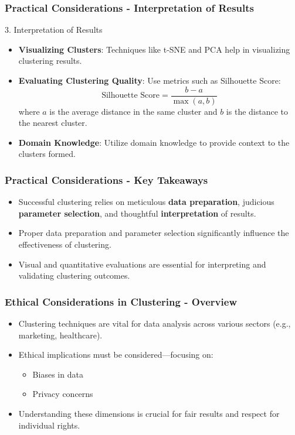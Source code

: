 \documentclass[aspectratio=169]{beamer}
\begin{document}
\begin{frame}[fragile]
    \frametitle{Practical Considerations - Interpretation of Results}
    \begin{block}{3. Interpretation of Results}
        \begin{itemize}
            \item \textbf{Visualizing Clusters}: Techniques like t-SNE and PCA help in visualizing clustering results.
            \item \textbf{Evaluating Clustering Quality}: Use metrics such as Silhouette Score:
            \begin{equation}
            \text{Silhouette Score} = \frac{b - a}{\max(a, b)}
            \end{equation}
            where \( a \) is the average distance in the same cluster and \( b \) is the distance to the nearest cluster.
            \item \textbf{Domain Knowledge}: Utilize domain knowledge to provide context to the clusters formed.
        \end{itemize}
    \end{block}
\end{frame}

\begin{frame}[fragile]
    \frametitle{Practical Considerations - Key Takeaways}
    \begin{itemize}
        \item Successful clustering relies on meticulous \textbf{data preparation}, judicious \textbf{parameter selection}, and thoughtful \textbf{interpretation} of results.
        \item Proper data preparation and parameter selection significantly influence the effectiveness of clustering.
        \item Visual and quantitative evaluations are essential for interpreting and validating clustering outcomes.
    \end{itemize}
\end{frame}

\begin{frame}[fragile]
    \frametitle{Ethical Considerations in Clustering - Overview}
    \begin{itemize}
        \item Clustering techniques are vital for data analysis across various sectors (e.g., marketing, healthcare).
        \item Ethical implications must be considered—focusing on:
        \begin{itemize}
            \item Biases in data
            \item Privacy concerns
        \end{itemize}
        \item Understanding these dimensions is crucial for fair results and respect for individual rights.
    \end{itemize}
\end{frame}
\end{document}
